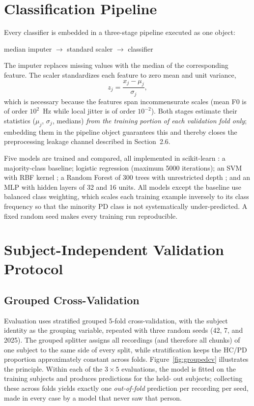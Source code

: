 \section{Classification Pipeline}

Every classifier is embedded in a three-stage pipeline executed as one
object:
\begin{center}
median imputer \; $\to$ \; standard scaler \; $\to$ \; classifier
\end{center}
The imputer replaces missing values with the median of the
corresponding feature. The scaler standardizes each feature to zero
mean and unit variance,
\begin{equation}
z_j = \frac{x_j - \mu_j}{\sigma_j},
\label{eq:zscore}
\end{equation}
which is necessary because the features span incommensurate scales
(mean F0 is of order $10^2$~Hz while local jitter is of order
$10^{-2}$). Both stages estimate their statistics
($\mu_j$, $\sigma_j$, medians) \emph{from the training portion of each
validation fold only}; embedding them in the pipeline object guarantees
this and thereby closes the preprocessing leakage channel described in
Section~2.6.

Five models are trained and compared, all implemented in scikit-learn
\cite{pedregosa2011}: a majority-class baseline; logistic regression
(maximum 5000 iterations); an SVM with RBF kernel \cite{cortes1995};
a Random Forest of 300 trees with unrestricted depth
\cite{breiman2001}; and an MLP with hidden layers of 32 and 16 units.
All models except the baseline use balanced class weighting, which
scales each training example inversely to its class frequency so that
the minority PD class is not systematically under-predicted. A fixed
random seed makes every training run reproducible.

\section{Subject-Independent Validation Protocol}

\subsection{Grouped Cross-Validation}

Evaluation uses stratified grouped 5-fold cross-validation, with the
subject identity as the grouping variable, repeated with three random
seeds (42, 7, and 2025). The grouped splitter assigns all recordings
(and therefore all chunks) of one subject to the same side of every
split, while stratification keeps the HC/PD proportion approximately
constant across folds. Figure~\ref{fig:groupedcv} illustrates the
principle. Within each of the $3\times5$ evaluations, the model is
fitted on the training subjects and produces predictions for the held-%
out subjects; collecting these across folds yields exactly one
\emph{out-of-fold} prediction per recording per seed, made in every
case by a model that never saw that person.

